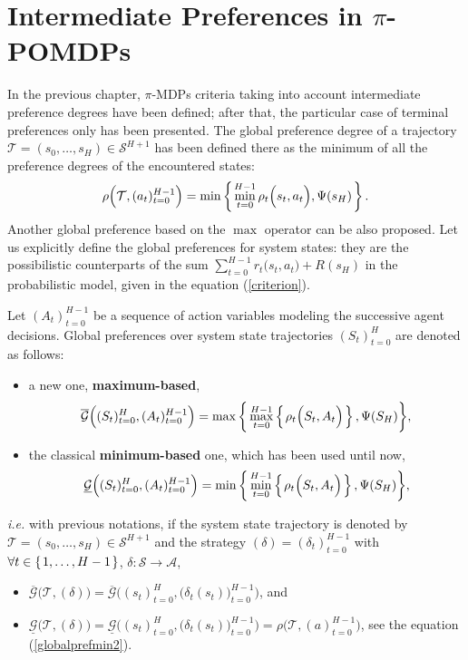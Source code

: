 \section{Intermediate Preferences in $\pi$-POMDPs}
In the previous chapter, 
$\pi$-MDPs criteria 
taking into account 
intermediate preference degrees
have been defined;
after that, the particular case 
of terminal preferences only 
has been presented. 
The global preference degree of a trajectory $\mathcal{T} = (s_0,\ldots,s_{H}) \in \mathcal{S}^{H+1}$ 
has been defined there as the minimum of all the preference degrees of the encountered states:
\begin{equation}
\label{globalprefmin2}
 \rho\Big(\mathcal{T},(a_t)_{t=0}^{H-1}\Big) = \min \left\{ \left.  \min_{t=0}^{H-1} \rho_t\Big(s_t,a_t\Big), \Psi(s_H)  \right. \right\}. 
\end{equation}
Another global preference based on the $\max$ operator can be also proposed. 
Let us explicitly define the global preferences for system states:
they are the possibilistic counterparts 
of the sum $\sum_{t = 0}^{H-1} r_t\Big( s_t, a_t \Big) + R(s_H)$ 
in the probabilistic model, given in the equation (\ref{criterion}).  
\begin{Def}
\label{def_globaldef}
Let $(A_t)_{t=0}^{H-1}$ be a sequence of action variables modeling the successive agent decisions.
Global preferences over system state trajectories $(S_t)_{t=0}^{H}$ are denoted as follows:
\begin{itemize}
\item a new one, \textbf{maximum-based},
\begin{equation}
\label{globalprefmax}
\overline{\mathcal{G}} \Big( (S_t)_{t=0}^{H}, (A_t)_{t=0}^{H-1} \Big) = \max \bigg\{ \max_{t=0}^{H-1} \left\{ \left.  \rho_t\Big( S_t, A_t \Big)   \right. \right\}, \Psi(S_H) \bigg\}, 
\end{equation}
\item the classical \textbf{minimum-based} one, which has been used until now,
\begin{equation}
\label{globalprefmin}
\underline{\mathcal{G}} \Big( (S_t)_{t=0}^{H}, (A_t)_{t=0}^{H-1} \Big) = \min \bigg\{ \min_{t=0}^{H-1} \left\{ \left.  \rho_t\Big( S_t, A_t \Big)   \right. \right\}, \Psi(S_H) \bigg\},
\end{equation}
\end{itemize}
 \textit{i.e.} with previous notations, 
if the system state trajectory is denoted by $\mathcal{T} = (s_0,\ldots,s_{H}) \in \mathcal{S}^{H+1}$
and the strategy $(\delta) = (\delta_t)_{t=0}^{H-1}$ with $\forall t \in \left\{ \left. 1,\ldots,H-1 \right. \right\}$, $\delta: \mathcal{S} \rightarrow \mathcal{A}$, 
\begin{itemize}
\item $\overline{\mathcal{G}} \Big( \mathcal{T}, (\delta) \Big) = \overline{\mathcal{G}} \bigg( (s_t)_{t=0}^{H}, \Big(\delta_t(s_t)\Big)_{t=0}^{H-1} \bigg)$, and
\item $\underline{\mathcal{G}} \Big( \mathcal{T}, (\delta) \Big) = \underline{\mathcal{G}} \bigg( (s_t)_{t=0}^{H}, \Big(\delta_t(s_t)\Big)_{t=0}^{H-1} \bigg) = \rho \Big( \mathcal{T},(a)_{t=0}^{H-1} \Big)$, see the equation (\ref{globalprefmin2}).
\end{itemize}
\end{Def}
